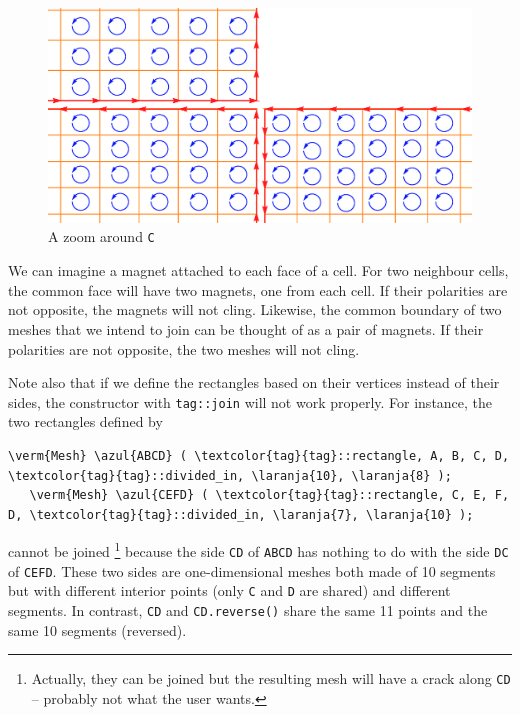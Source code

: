 \begin{figure}[ht]  \centering
  \includegraphics[width=120mm]{L-crack}
  \caption{A zoom around {\small\tt C}}
  \label{\numb section 1.\numb fig 6}
\end{figure}

We can imagine a magnet attached to each face of a cell.
For two neighbour cells, the common face will have two magnets, one from each cell.
If their polarities are not opposite, the magnets will not cling.
Likewise, the common boundary of two meshes that we intend to join can be thought of
as a pair of magnets.
If their polarities are not opposite, the two meshes will not cling.

Note also that if we define the rectangles based on their vertices instead of their sides, 
the {\small\tt{}} constructor with {\small\tt \textcolor{tag}{tag}::join} will
not work properly. 
For instance, the two rectangles defined by

\begin{Verbatim}[commandchars=\\\{\},formatcom=\small\tt,baselinestretch=0.94]
   \verm{Mesh} \azul{ABCD} ( \textcolor{tag}{tag}::rectangle, A, B, C, D, \textcolor{tag}{tag}::divided_in, \laranja{10}, \laranja{8} );
   \verm{Mesh} \azul{CEFD} ( \textcolor{tag}{tag}::rectangle, C, E, F, D, \textcolor{tag}{tag}::divided_in, \laranja{7}, \laranja{10} );
\end{Verbatim}

\noindent cannot be joined%
\footnote {{} Actually, they can be joined but the resulting mesh will have
a crack along {\small\tt CD} -- probably not what the user wants.}
because the side {\small\tt CD} of {\small\tt ABCD} has nothing to do with the side 
{\small\tt DC} of {\small\tt CEFD}.
These two sides are one-dimensional meshes both made of 10 segments but with different
interior points (only {\small\tt C} and {\small\tt D} are shared) and different segments.
In contrast, {\small\tt CD} and {\small\tt CD.reverse()} share the same 11 points and
the same 10 segments (reversed).

